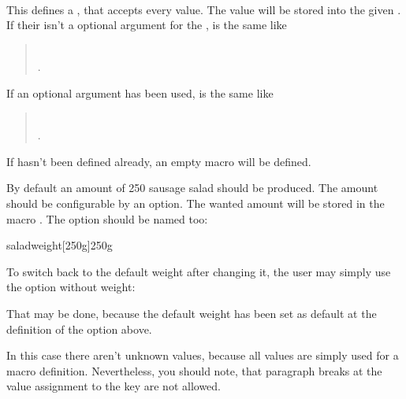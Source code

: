 \begin{Declaration}
                         \\
\end{Declaration}
%
This defines a , that accepts
every value. The value will be stored into the given . If their
isn't a optional argument for the ,  is
the same like
\begin{quote}
%
\\
%
.
\end{quote}
If an optional argument  has been used, 
is the same like
\begin{quote}
%
\\
%
%
.
\end{quote}
If  hasn't been defined already, an empty macro will be
defined.
\begin{Example}
  By default an amount of 250 sausage salad should be produced. The
  amount should be configurable by an option. The wanted amount will be stored
  in the macro . The option should be named
   too:
\begin{lstcode}
  \newcommand*{\saladweight}{250g}
                  {saladweight}[250g]{\saladweight}
\end{lstcode}
  To switch back to the default weight after changing it, the user may simply
  use the option without weight:
\begin{lstcode}
\end{lstcode}
  That may be done, because the default weight has been set as default at the
  definition of the option above.
\end{Example}
In this case there aren't unknown values, because all values are simply used
for a macro definition. Nevertheless, you should note, that paragraph breaks
at the value assignment to the key are not allowed.
%
%


